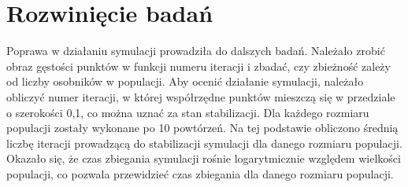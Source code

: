 \section{Rozwinięcie badań}

Poprawa w działaniu symulacji prowadziła do dalszych badań. Należało zrobić obraz gęstości punktów w funkcji numeru iteracji i zbadać, czy zbieżność zależy od liczby osobników w populacji.
Aby ocenić działanie symulacji, należało obliczyć numer iteracji, w której współrzędne punktów mieszczą się w przedziale o szerokości 0,1, co można uznać za stan stabilizacji.
Dla każdego rozmiaru populacji zostały wykonane po 10 powtórzeń. Na tej podstawie obliczono średnią liczbę iteracji prowadzącą do stabilizacji symulacji dla danego rozmiaru populacji.
Okazało się, że czas zbiegania symulacji rośnie logarytmicznie względem wielkości populacji, co pozwala przewidzieć czas zbiegania dla danego rozmiaru populacji.